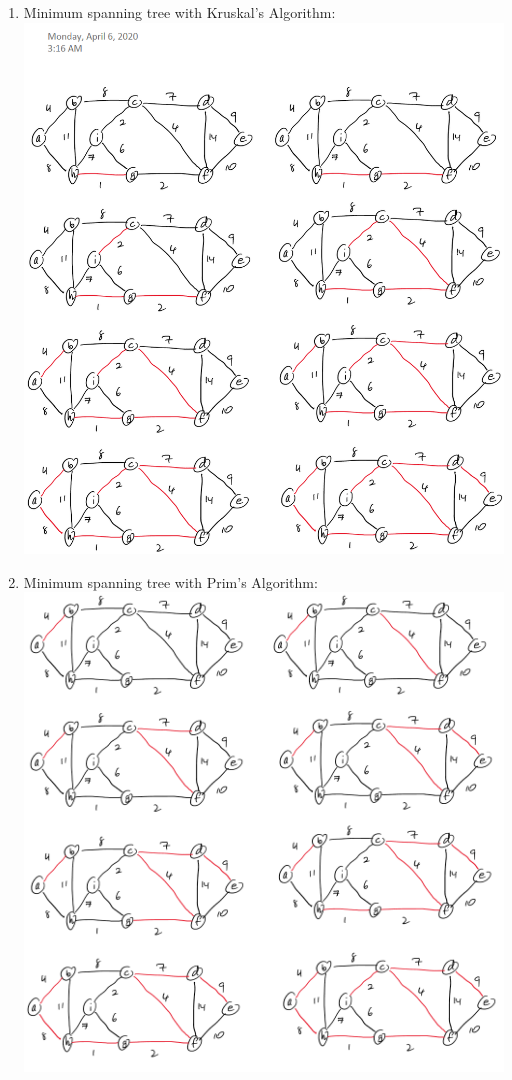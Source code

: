 \documentclass[11pt,fleqn]{article}
\begin{document}
\begin{enumerate}
\begin{enumerate}
		\item Minimum spanning tree with Kruskal’s Algorithm: \\
\includegraphics[scale=0.75]{Q9b}

\newpage

		\item Minimum spanning tree with Prim’s Algorithm: \\
\includegraphics[scale=0.75]{Q9c}
	\end{enumerate}
\end{enumerate}
\end{document}
